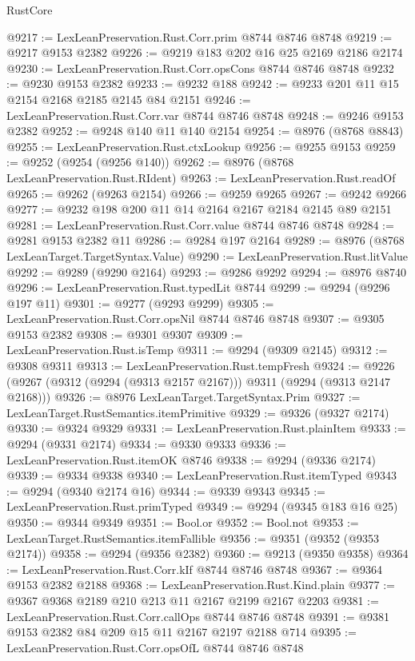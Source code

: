 \begin{lexlean}{RustCore}
\begin{coremodule}
@9217 := LexLeanPreservation.Rust.Corr.prim @8744 @8746 @8748
@9219 := @9217 @9153 @2382
@9226 := @9219 @183 @202 @16 @25 @2169 @2186 @2174
@9230 := LexLeanPreservation.Rust.Corr.opsCons @8744 @8746 @8748
@9232 := @9230 @9153 @2382
@9233 := @9232 @188
@9242 := @9233 @201 @11 @15 @2154 @2168 @2185 @2145 @84 @2151
@9246 := LexLeanPreservation.Rust.Corr.var @8744 @8746 @8748
@9248 := @9246 @9153 @2382
@9252 := @9248 @140 @11 @140 @2154
@9254 := @8976 (@8768 @8843)
@9255 := LexLeanPreservation.Rust.ctxLookup
@9256 := @9255 @9153
@9259 := @9252 (@9254 (@9256 @140))
@9262 := @8976 (@8768 LexLeanPreservation.Rust.RIdent)
@9263 := LexLeanPreservation.Rust.readOf
@9265 := @9262 (@9263 @2154)
@9266 := @9259 @9265
@9267 := @9242 @9266
@9277 := @9232 @198 @200 @11 @14 @2164 @2167 @2184 @2145 @89 @2151
@9281 := LexLeanPreservation.Rust.Corr.value @8744 @8746 @8748
@9284 := @9281 @9153 @2382 @11
@9286 := @9284 @197 @2164
@9289 := @8976 (@8768 LexLeanTarget.TargetSyntax.Value)
@9290 := LexLeanPreservation.Rust.litValue
@9292 := @9289 (@9290 @2164)
@9293 := @9286 @9292
@9294 := @8976 @8740
@9296 := LexLeanPreservation.Rust.typedLit @8744
@9299 := @9294 (@9296 @197 @11)
@9301 := @9277 (@9293 @9299)
@9305 := LexLeanPreservation.Rust.Corr.opsNil @8744 @8746 @8748
@9307 := @9305 @9153 @2382
@9308 := @9301 @9307
@9309 := LexLeanPreservation.Rust.isTemp
@9311 := @9294 (@9309 @2145)
@9312 := @9308 @9311
@9313 := LexLeanPreservation.Rust.tempFresh
@9324 := @9226 (@9267 (@9312 (@9294 (@9313 @2157 @2167))) @9311 (@9294 (@9313 @2147 @2168)))
@9326 := @8976 LexLeanTarget.TargetSyntax.Prim
@9327 := LexLeanTarget.RustSemantics.itemPrimitive
@9329 := @9326 (@9327 @2174)
@9330 := @9324 @9329
@9331 := LexLeanPreservation.Rust.plainItem
@9333 := @9294 (@9331 @2174)
@9334 := @9330 @9333
@9336 := LexLeanPreservation.Rust.itemOK @8746
@9338 := @9294 (@9336 @2174)
@9339 := @9334 @9338
@9340 := LexLeanPreservation.Rust.itemTyped
@9343 := @9294 (@9340 @2174 @16)
@9344 := @9339 @9343
@9345 := LexLeanPreservation.Rust.primTyped
@9349 := @9294 (@9345 @183 @16 @25)
@9350 := @9344 @9349
@9351 := Bool.or
@9352 := Bool.not
@9353 := LexLeanTarget.RustSemantics.itemFallible
@9356 := @9351 (@9352 (@9353 @2174))
@9358 := @9294 (@9356 @2382)
@9360 := @9213 (@9350 @9358)
@9364 := LexLeanPreservation.Rust.Corr.kIf @8744 @8746 @8748
@9367 := @9364 @9153 @2382 @2188
@9368 := LexLeanPreservation.Rust.Kind.plain
@9377 := @9367 @9368 @2189 @210 @213 @11 @2167 @2199 @2167 @2203
@9381 := LexLeanPreservation.Rust.Corr.callOps @8744 @8746 @8748
@9391 := @9381 @9153 @2382 @84 @209 @15 @11 @2167 @2197 @2188 @714
@9395 := LexLeanPreservation.Rust.Corr.opsOfL @8744 @8746 @8748

\end{coremodule}
\end{lexlean}
